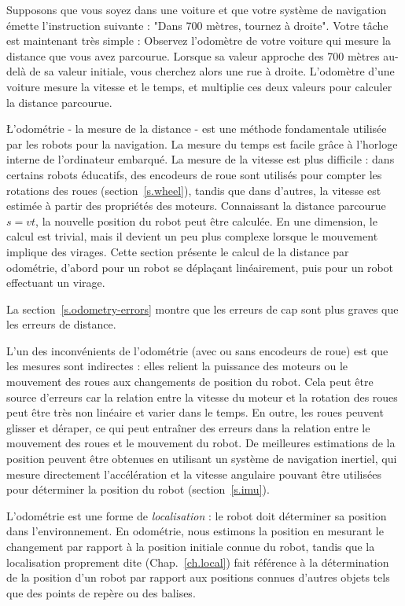 Supposons que vous soyez dans une voiture et que votre système de navigation émette l'instruction suivante : "Dans 700 mètres, tournez à droite". Votre tâche est maintenant très simple : Observez l'odomètre de votre voiture qui mesure la distance que vous avez parcourue. Lorsque sa valeur approche des 700 mètres au-delà de sa valeur initiale, vous cherchez alors une rue à droite. L'odomètre d'une voiture mesure la vitesse et le temps, et multiplie ces deux valeurs pour calculer la distance parcourue.

\L'odométrie - la mesure de la distance - est une méthode fondamentale utilisée par les robots pour la navigation. La mesure du temps est facile grâce à l'horloge interne de l'ordinateur embarqué. La mesure de la vitesse est plus difficile : dans certains robots éducatifs, des encodeurs de roue sont utilisés pour compter les rotations des roues (section~\ref{s.wheel}), tandis que dans d'autres, la vitesse est estimée à partir des propriétés des moteurs. Connaissant la distance parcourue $s=vt$, la nouvelle position du robot peut être calculée. En une dimension, le calcul est trivial, mais il devient un peu plus complexe lorsque le mouvement implique des virages. Cette section présente le calcul de la distance par odométrie, d'abord pour un robot se déplaçant linéairement, puis pour un robot effectuant un virage.

La section~\ref{s.odometry-errors} montre que les erreurs de cap sont plus graves que les erreurs de distance.

L'un des inconvénients de l'odométrie (avec ou sans encodeurs de roue) est que les mesures sont indirectes : elles relient la puissance des moteurs ou le mouvement des roues aux changements de position du robot. Cela peut être source d'erreurs car la relation entre la vitesse du moteur et la rotation des roues peut être très non linéaire et varier dans le temps. En outre, les roues peuvent glisser et déraper, ce qui peut entraîner des erreurs dans la relation entre le mouvement des roues et le mouvement du robot. De meilleures estimations de la position peuvent être obtenues en utilisant un système de navigation inertiel, qui mesure directement l'accélération et la vitesse angulaire pouvant être utilisées pour déterminer la position du robot (section~\ref{s.imu}).

L'odométrie est une forme de \emph{localisation} : le robot doit déterminer sa position dans l'environnement. En odométrie, nous estimons la position en mesurant le changement par rapport à la position initiale connue du robot, tandis que la localisation proprement dite (Chap.~\ref{ch.local}) fait référence à la détermination de la position d'un robot par rapport aux positions connues d'autres objets tels que des points de repère ou des balises.

